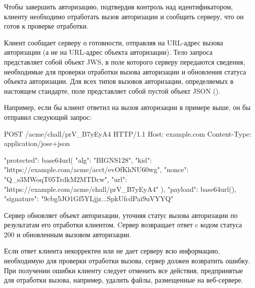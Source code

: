 
Чтобы завершить авторизацию, подтвердив контроль над идентификатором, клиенту
необходимо отработать вызов авторизации и сообщить серверу, что он готов к
проверке отработки.

Клиент сообщает серверу о готовности, отправляя 
 на URL-адрес вызова авторизации 
(а не на URL-адрес объекта авторизации). Тело запроса представляет собой объект 
JWS, в поле  которого серверу передаются сведения, необходимые 
для проверки отработки вызова авторизации и обновления статуса объекта 
авторизации. Для всех типов вызовов авторизации, определяемых в настоящем 
стандарте, поле  представляет собой пустой объект JSON 
(\sstr{\{\}}).


Например, если бы клиент ответил на вызов авторизации  в примере 
выше, он бы отправил следующий запрос:  

\begin{codeblock}
POST /acme/chall/prV_B7yEyA4 HTTP/1.1
Host: example.com
Content-Type: application/jose+json

{
  "protected": base64url({
    "alg": "BIGNS128",
    "kid": "https://example.com/acme/acct/evOfKhNU60wg",
    "nonce": "Q_s3MWoqT05TrdkM2MTDcw",
    "url": "https://example.com/acme/chall/prV_B7yEyA4"
  }),
  "payload": base64url({}),
  "signature": "9cbg5JO1Gf5YLjjz...SpkUfcdPai9uVYYQ"
}
\end{codeblock}
\fi

Сервер обновляет объект авторизации, уточняя статус вызова авторизации по 
результатам его отработки клиентом. 
%
%
Cервер возвращает ответ c кодом статуса 200 и обновленным вызовом авторизации.

Если ответ клиента некорректен или не дает серверу всю информацию,
необходимую для проверки отработки вызова, сервер должен возвратить ошибку.  
При получении ошибки клиенту следует отменить все действия, предпринятые для 
отработки вызова, например, удалить файлы, размещенные на веб-сервере. 


